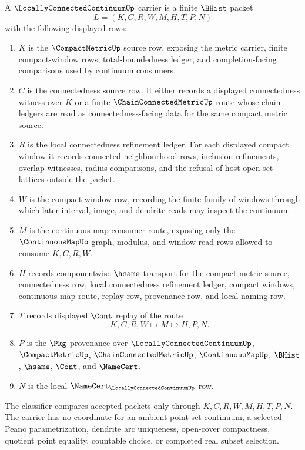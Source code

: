 \begin{definition}
\label{def:locally-connected-continuum-carrier}
A $\LocallyConnectedContinuumUp$ carrier is a finite $\BHist$ packet
$$
L=(K,C,R,W,M,H,T,P,N)
$$
with the following displayed rows:
\begin{enumerate}
\item $K$ is the $\CompactMetricUp$ source row, exposing the metric carrier, finite compact-window rows, total-boundedness ledger, and completion-facing comparisons used by continuum consumers.
\item $C$ is the connectedness source row. It either records a displayed connectedness witness over $K$ or a finite $\ChainConnectedMetricUp$ route whose chain ledgers are read as connectedness-facing data for the same compact metric source.
\item $R$ is the local connectedness refinement ledger. For each displayed compact window it records connected neighbourhood rows, inclusion refinements, overlap witnesses, radius comparisons, and the refusal of host open-set lattices outside the packet.
\item $W$ is the compact-window row, recording the finite family of windows through which later interval, image, and dendrite reads may inspect the continuum.
\item $M$ is the continuous-map consumer route, exposing only the $\ContinuousMapUp$ graph, modulus, and window-read rows allowed to consume $K,C,R,W$.
\item $H$ records componentwise $\hsame$ transport for the compact metric source, connectedness row, local connectedness refinement ledger, compact windows, continuous-map route, replay row, provenance row, and local naming row.
\item $T$ records displayed $\Cont$ replay of the route
$$
K,C,R,W \longmapsto M \longmapsto H,P,N .
$$
\item $P$ is the $\Pkg$ provenance over $\LocallyConnectedContinuumUp$, $\CompactMetricUp$, $\ChainConnectedMetricUp$, $\ContinuousMapUp$, $\BHist$, $\hsame$, $\Cont$, and $\NameCert$.
\item $N$ is the local $\NameCert_{\LocallyConnectedContinuumUp}$ row.
\end{enumerate}
The classifier compares accepted packets only through $K,C,R,W,M,H,T,P,N$. The carrier has no coordinate for an ambient point-set continuum, a selected Peano parametrization, dendrite arc uniqueness, open-cover compactness, quotient point equality, countable choice, or completed real subset selection.
\end{definition}

